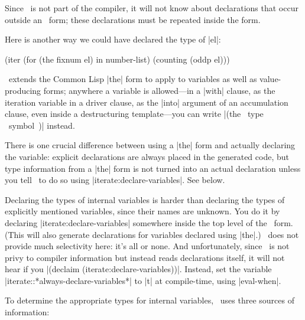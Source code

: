 Since \iter\ is not part of the compiler, it will not know
about declarations that occur outside an \iter\ form; these
declarations must be repeated inside the form.

Here is another way we could have declared the type of |el|:
\begin{program}
(iter (for (the fixnum el) in number-list)
      (counting (oddp el)))
\end{program}
\iter\ extends the Common Lisp |the|
form to apply to variables as well as value-producing forms; anywhere
a variable is allowed---in a |with| clause, as the iteration
variable in a driver clause, as the |into| argument of an
accumulation clause, even inside a destructuring template---you can
write |(the ~type~ ~symbol~)| instead.

There is one crucial difference between using a |the| form and
actually declaring the variable: explicit declarations are always
placed in the generated code, but type information from a |the|
form is not turned into an actual declaration unless you tell \iter\
to do so using |iterate:declare-variables|.  See below.

\begin{sloppypar}
Declaring the types of internal variables is harder than declaring the
types of explicitly mentioned variables, since their names
are unknown.  You do it by declaring |iterate:declare-variables|
somewhere inside the top level of the \iter\ form.  (This will also
generate declarations for variables declared using |the|.)
\iter\ does not provide much selectivity here: it's all or none.
And unfortunately, since \iter\ is not privy to compiler information
but instead reads declarations itself, it will not hear if you
|(declaim (iterate:declare-variables))|.  Instead, set the variable
|iterate::*always-declare-variables*| to |t| at
compile-time, using |eval-when|.
\end{sloppypar}

To determine the appropriate types for internal variables, \iter\ uses
three sources of information:

